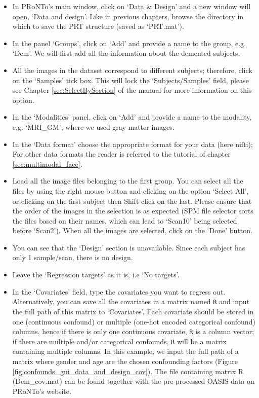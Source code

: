 \begin{itemize}
	
	\item In PRoNTo's main window, click on `Data \& Design' and a new window will open, `Data and design'. Like in previous chapters, browse the directory in which to save the PRT structure (saved as `PRT.mat'). 
	
	\item In the panel ‘Groups’, click on `Add’ and provide a name to the group, e.g. `Dem'. We will first add all the information about the demented subjects.
	
	\item All the images in the dataset correspond to different subjects; therefore, click on the ‘Samples’ tick box. This will lock the ‘Subjects/Samples’ field, please see Chapter \ref{sec:SelectBySection} of the manual for more information on this option.
	
	\item In the `Modalities' panel, click on `Add' and provide a name to the modality, e.g. `MRI\_GM', where we used gray matter images.
	
	\item In the `Data format' choose the appropriate format for your data (here nifti); For other data formats the reader is referred to the tutorial of chapter \ref{sec:multimodal_face}.
	
	
	\item Load all the image files belonging to the first group. You can select all the files by using the right mouse button and clicking on the option `Select All', or clicking on the first subject then Shift-click on the last. Please ensure that the order of the images in the selection is as expected (SPM file selector sorts the files based on their names, which can lead to `Scan10' being selected before `Scan2'). When all the images are selected, click on the `Done' button.
	
	\item You can see that the `Design' section is unavailable. Since each subject has only 1 sample/scan, there is no design.
	
	\item Leave the `Regression targets' as it is, i.e `No targets'.
	
	\item In the `Covariates' field, type the covariates you want to regress out. Alternatively, you can save all the covariates in a matrix named {\tt R} and input the full path of this matrix to `Covariates'. Each covariate should be stored in one (continuous confound) or multiple (one-hot encoded categorical confound) columns, hence if there is only one continuous covariate, {\tt R} is a column vector; if there are multiple and/or categorical confounds, {\tt R} will be a matrix containing multiple columns. In this example, we input the full path of a matrix where gender and age are the chosen confounding factors (Figure \ref{fig:confounds_gui_data_and_design_cov}). The file containing matrix R (Dem\_cov.mat) can be found together with the pre-processed OASIS data on PRoNTo's website.
	

\end{itemize}
